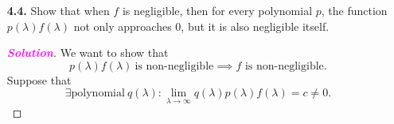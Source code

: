 \documentclass[12pt,openany]{book}
\theoremstyle{definition}
\newcommand{\sol}{\textcolor{magenta}{\bf Solution}}
\begin{document}
\begin{itemize}
\begin{proof}[\sol]
%						
%						
%							
		\end{proof}
		\item[\bf 4.4.] Show that when $f$ is negligible, then for every polynomial $p$, the function $p(\lambda)f(\lambda)$ not only approaches $0$, but it is also negligible itself.
			\begin{proof}[\sol]
				We want to show that \[
				p(\lambda)f(\lambda)\ \text{is non-negligible}\implies\text{$f$ is non-negligible}.
				\] Suppose that \[
				\exists\text{polynomial}\ q(\lambda):\lim\limits_{\lambda\to\infty}q(\lambda)p(\lambda)f(\lambda)=c\neq0.
\]
\end{proof}
\end{itemize}
\end{document}
